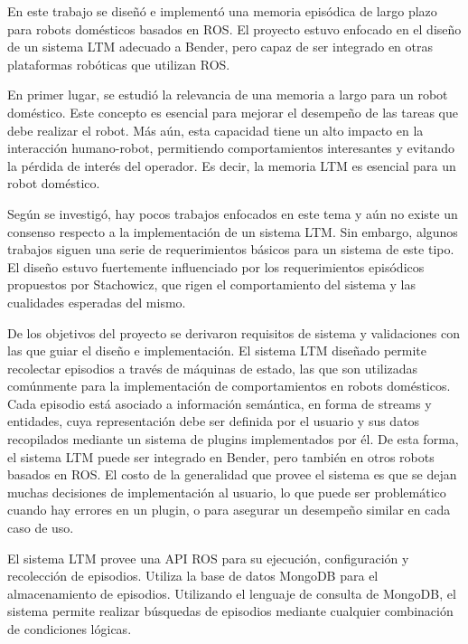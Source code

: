 \begin{conclusion}

En este trabajo se diseñó e implementó una memoria episódica de largo plazo para robots domésticos basados en ROS. El proyecto estuvo enfocado en el diseño de un sistema LTM adecuado a Bender, pero capaz de ser integrado en otras plataformas robóticas que utilizan ROS.

En primer lugar, se estudió la relevancia de una memoria a largo para un robot doméstico. Este concepto es esencial para mejorar el desempeño de las tareas que debe realizar el robot. Más aún, esta capacidad tiene un alto impacto en la interacción humano-robot, permitiendo comportamientos interesantes y evitando la pérdida de interés del operador. Es decir, la memoria LTM es esencial para un robot doméstico.

Según se investigó, hay pocos trabajos enfocados en este tema y aún no existe un consenso respecto a la implementación de un sistema LTM. Sin embargo, algunos trabajos siguen una serie de requerimientos básicos para un sistema de este tipo. El diseño estuvo fuertemente influenciado por los requerimientos episódicos propuestos por Stachowicz, que rigen el comportamiento del sistema y las cualidades esperadas del mismo.

De los objetivos del proyecto se derivaron requisitos de sistema y validaciones con las que guiar el diseño e implementación. El sistema LTM diseñado permite recolectar episodios a través de máquinas de estado, las que son utilizadas comúnmente para la implementación de comportamientos en robots domésticos. Cada episodio está asociado a información semántica, en forma de streams y entidades, cuya representación debe ser definida por el usuario y sus datos recopilados mediante un sistema de plugins implementados por él. De esta forma, el sistema LTM puede ser integrado en Bender, pero también en otros robots basados en ROS. El costo de la generalidad que provee el sistema es que se dejan muchas decisiones de implementación al usuario, lo que puede ser problemático cuando hay errores en un plugin, o para asegurar un desempeño similar en cada caso de uso.

El sistema LTM provee una API ROS para su ejecución, configuración y recolección de episodios. Utiliza la base de datos MongoDB para el almacenamiento de episodios. Utilizando el lenguaje de consulta de MongoDB, el sistema permite realizar búsquedas de episodios mediante cualquier combinación de condiciones lógicas.



\end{conclusion}
